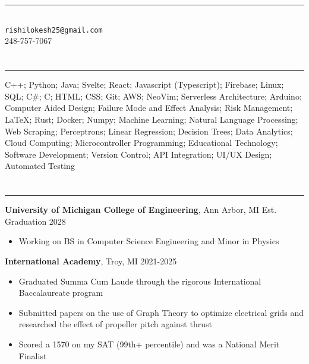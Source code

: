 \documentclass{article}[11pt]
\newcommand{\underlinedsection}[1]{ \section*{\sc{#1}}
	\rule{\textwidth}{1pt} }
\newenvironment{denseitemize} %
{ \begin{itemize}[leftmargin = 20pt, topsep = 0pt, itemsep = 0pt] }
{\end{itemize} }
\newcommand{\education}[3]{ {\textbf{#1}, {#2} \hfill {#3}} }
\begin{document}
\normalsize
\singlespacing

\section*{\centering {}} 
\begin{center}
\rule{3in}{1pt} \\
\texttt{rishilokesh25@gmail.com} \\
248-757-7067 
\end{center} 

\underlinedsection{Skills}
C++; Python; Java; Svelte; React; Javascript (Typescript); Firebase; Linux; SQL; C\#; C; HTML; CSS; Git; AWS; NeoVim; Serverless Architecture; Arduino; Computer Aided Design; Failure Mode and Effect Analysis; Risk Management; LaTeX; Rust; Docker; Numpy; Machine Learning; Natural Language Processing; Web Scraping; Perceptrons; Linear Regression; Decision Trees; Data Analytics; Cloud Computing; Microcontroller Programming; Educational Technology; Software Development; Version Control; API Integration; UI/UX Design; Automated Testing

\underlinedsection{Education}
\education{University of Michigan College of Engineering}{Ann Arbor, MI}{Est. Graduation 2028}

\begin{denseitemize}
	\item Working on BS in Computer Science Engineering and Minor in Physics 
\end{denseitemize}
\education{International Academy}{Troy, MI}{2021-2025}
\begin{denseitemize}
	\item Graduated Summa Cum Laude through the rigorous International Baccalaureate program 
        \item Submitted papers on the use of Graph Theory to optimize electrical grids and researched the effect of propeller pitch against thrust
        \item Scored a 1570 on my SAT (99th+ percentile) and was a National Merit Finalist

\end{denseitemize}
\end{document}
